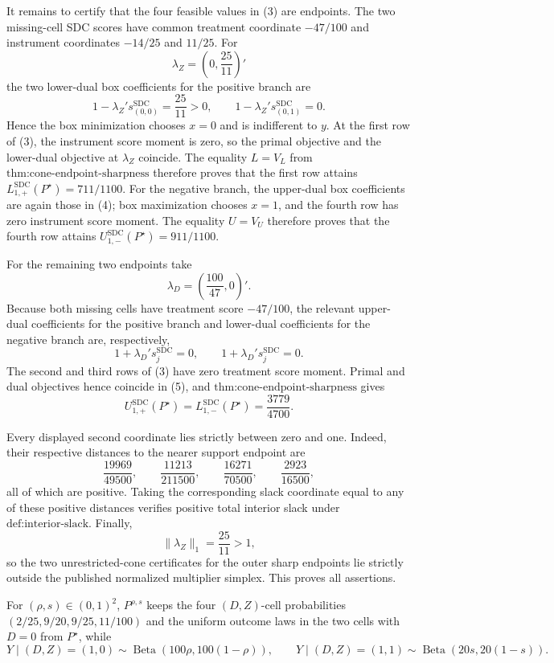 It remains to certify that the four feasible values in (3) are endpoints.  The two missing-cell SDC scores have common treatment coordinate \(-47/100\) and instrument coordinates \(-14/25\) and \(11/25\).  For
\[
 \lambda_Z=\left(0,\frac{25}{11}\right)'
\]
the two lower-dual box coefficients for the positive branch are
\[
 1-\lambda_Z's_{(0,0)}^{\mathrm{SDC}}=\frac{25}{11}>0,
 \qquad
 1-\lambda_Z's_{(0,1)}^{\mathrm{SDC}}=0. \tag{4}
\]
Hence the box minimization chooses \(x=0\) and is indifferent to \(y\).  At the first row of (3), the instrument score moment is zero, so the primal objective and the lower-dual objective at \(\lambda_Z\) coincide.  The equality \(L=V_L\) from \(\text{thm:cone-endpoint-sharpness}\) therefore proves that the first row attains \(L_{1,+}^{\mathrm{SDC}}(P^\star)=711/1100\).  For the negative branch, the upper-dual box coefficients are again those in (4); box maximization chooses \(x=1\), and the fourth row has zero instrument score moment.  The equality \(U=V_U\) therefore proves that the fourth row attains \(U_{1,-}^{\mathrm{SDC}}(P^\star)=911/1100\).

For the remaining two endpoints take
\[
 \lambda_D=\left(\frac{100}{47},0\right)'.
\]
Because both missing cells have treatment score \(-47/100\), the relevant upper-dual coefficients for the positive branch and lower-dual coefficients for the negative branch are, respectively,
\[
 1+\lambda_D's_j^{\mathrm{SDC}}=0,
 \qquad
 1+\lambda_D's_j^{\mathrm{SDC}}=0. \tag{5}
\]
The second and third rows of (3) have zero treatment score moment.  Primal and dual objectives hence coincide in (5), and \(\text{thm:cone-endpoint-sharpness}\) gives
\[
 U_{1,+}^{\mathrm{SDC}}(P^\star)
 =L_{1,-}^{\mathrm{SDC}}(P^\star)
 =\frac{3779}{4700}.
\]

Every displayed second coordinate lies strictly between zero and one.  Indeed, their respective distances to the nearer support endpoint are
\[
 \frac{19969}{49500},\qquad
 \frac{11213}{211500},\qquad
 \frac{16271}{70500},\qquad
 \frac{2923}{16500},
\]
all of which are positive.  Taking the corresponding slack coordinate equal to any of these positive distances verifies positive total interior slack under \(\text{def:interior-slack}\).  Finally,
\[
 \|\lambda_Z\|_1=\frac{25}{11}>1,
\]
so the two unrestricted-cone certificates for the outer sharp endpoints lie strictly outside the published normalized multiplier simplex.  This proves all assertions.

For \((\rho,s)\in(0,1)^2\), \(P^{\rho,s}\) keeps the four \((D,Z)\)-cell probabilities \((2/25,9/20,9/25,11/100)\) and the uniform outcome laws in the two cells with \(D=0\) from \(P^\star\), while
\[
 Y\mid(D,Z)=(1,0)\sim\operatorname{Beta}(100\rho,100(1-\rho)),
 \qquad
 Y\mid(D,Z)=(1,1)\sim\operatorname{Beta}(20s,20(1-s)).
\]

